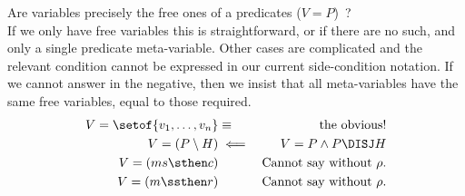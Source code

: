 Are variables precisely the free ones of a predicates ($V = P$)~?
\\If we only have free variables this is straightforward,
or if there are no such, and only a single predicate meta-variable.
Other cases are complicated and the relevant condition cannot be
expressed in our current side-condition notation.
If we cannot answer in the negative,
then we insist that all meta-variables have the same free variables,
equal to those required.
\begin{eqnarray*}
  V = \setof{v_1,\ldots,v_n} &\equiv& \mbox{the obvious!}
\\ V = ( P \setminus H ) &\impliedby & V = P \land P \DISJ H
\\ V = ( ms \sthen c ) && \textrm{Cannot say without } \rho.
\\ V = ( m \ssthen r ) && \textrm{Cannot say without } \rho.
\end{eqnarray*} 